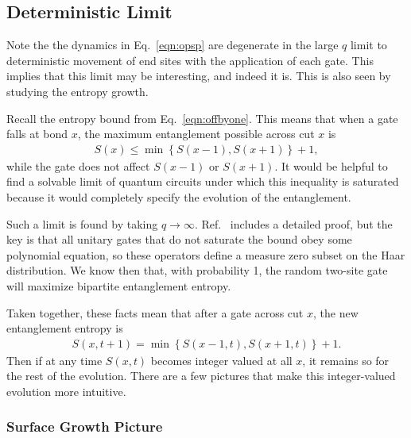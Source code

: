 \subsection{Deterministic Limit}  \label{sub:determ}

Note the the dynamics in Eq.~\ref{eqn:opsp} are degenerate in the large $q$ limit to deterministic movement of end sites with the application of each gate. This implies that this limit may be interesting, and indeed it is. This is also seen by studying the entropy growth.

Recall the entropy bound from Eq.~\ref{eqn:offbyone}. This means that when a gate falls at bond $x$, the maximum entanglement possible across cut $x$ is 
\begin{align}
S(x) \le \min\left\lbrace S(x-1), S(x+1)\right\rbrace + 1, \nonumber
\end{align}
while the gate does not affect $S(x-1)$ or $S(x+1)$. It would be helpful to find a solvable limit of quantum circuits under which this inequality is saturated because it would completely specify the evolution of the entanglement. 


Such a limit is found by taking $q\to\infty$. Ref.~\cite{Nahum2017} includes a detailed proof, but the key is that all unitary gates that do not saturate the bound obey some polynomial equation, so these operators define a measure zero subset on the Haar distribution. We know then that, with probability 1, the random two-site gate will maximize bipartite entanglement entropy.

Taken together, these facts mean that after a gate across cut $x$, the new entanglement entropy is
\begin{align}
S(x, t+1) = \min\left\lbrace S(x-1, t), S(x+1, t)\right\rbrace + 1.
	\label{eqn:update}
\end{align}
Then if at any time $S(x,t)$ becomes integer valued at all $x$, it remains so for the rest of the evolution. There are a few pictures that make this integer-valued evolution more intuitive.

\subsubsection{Surface Growth Picture}  \label{subsub:surfgrowth}

